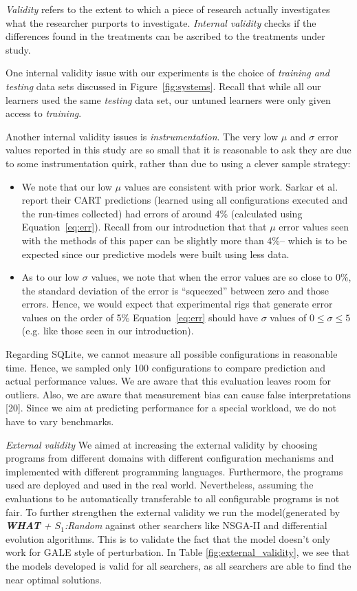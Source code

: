 \documentclass{sig-alternative}
\newcommand{\bi}{\begin{itemize}}%
\newcommand{\ei}{\end{itemize}}
\newcommand{\fig}[1]{Figure~\ref{fig:#1}}
\newcommand{\eq}[1]{Equation~\ref{eq:#1}}
\newcommand{\what}{{\bf WHAT }}
\begin{document}
{\em Validity} refers to the extent to which a piece of research actually
investigates what the researcher purports to investigate.
{\em Internal validity} checks if the differences found in
the treatments can be ascribed to the treatments under study. 

One internal validity issue with our experiments is the choice
of {\em training and testing} data sets discussed in 
\fig{systems}. Recall that while all our learners used the same
{\em testing} data set, our untuned learners were only given
access to {\em training}.

Another internal validity issues is {\em instrumentation}. The very low $\mu$ and $\sigma$ error values
reported in this study are so small that it is reasonable to ask they are due to some instrumentation
quirk, rather than due to using a clever sample strategy:
\bi
\item
We note that our low $\mu$ values are consistent with prior work.  Sarkar et al.~\cite{sarkar2015cost} report their CART predictions
(learned using all configurations executed and the run-times collected) had  errors of around 4\% (calculated using \eq{err}). Recall from our introduction that that  $\mu$ error values  seen with the methods of this paper
can be slightly more than 4\%-- which is to be expected since our predictive models were built using less
data. 
\item
As to our low $\sigma$ values, we note that when the  error values are so close to 0\%, the standard
deviation of the error is ``squeezed'' between zero and those errors. Hence, we would expect that
experimental rigs
that generate error values on the order of 5\% \eq{err} should have $\sigma$ values of $0\le \sigma \le 5$ (e.g. like those seen in our introduction).
\ei

Regarding SQLite, we cannot measure all possible configurations in reasonable time. Hence, we sampled only 100 configurations to compare prediction and actual performance values. We are aware that this evaluation leaves room for outliers.
Also, we are aware that measurement bias can cause false interpretations [20]. Since we aim at predicting performance for a special workload, we do not have to vary benchmarks.



{\em External validity}  We aimed at increasing the external validity by choosing programs from different domains with different configuration mechanisms and implemented with different programming languages. Furthermore, the programs used are deployed and used in the real world. Nevertheless, assuming the evaluations to be automatically transferable  to all configurable programs is not fair. To further strengthen the external validity we run the model(generated by \textit{\what + $S_1$:Random} against other searchers like NSGA-II and differential evolution algorithms\cite{storn1997differential}. This is to validate the fact that the model doesn't only work for GALE style of perturbation. In Table \ref{fig:external_validity}, we see that the models developed is valid for all searchers, as all searchers are able to find the near optimal solutions.
\end{document}
